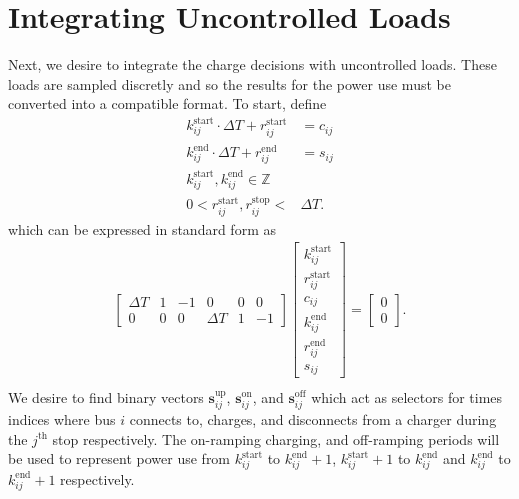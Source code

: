 \section{Integrating Uncontrolled Loads}
Next, we desire to integrate the charge decisions with uncontrolled loads.  These loads are sampled discretly and so the results for the power use must be converted into a compatible format.  To start, define
\begin{equation}
	\begin{aligned}
		k^{\text{start}}_{ij}\cdot\Delta T + r^{\text{start}}_{ij}&= c_{ij} \\
		k^{\text{end}}_{ij}\cdot\Delta T + r^{\text{end}}_{ij}&= s_{ij} \\
	k^{\text{start}}_{ij}, k^{\text{end}}_{ij} \in \mathbb{Z} \\
	0 < r^{\text{start}}_{ij}, r^{\text{stop}}_{ij} < &\Delta T.
	\end{aligned}
\end{equation} 
which can be expressed in standard form as 
\begin{equation} \begin{aligned}
	\begin{bmatrix}\Delta T & 1 & -1 & 0 & 0 & 0\\ 0 & 0 & 0 & \Delta T & 1 & -1\end{bmatrix} \begin{bmatrix}k_{ij}^{\text{start}} \\ r_{ij}^{\text{start}} \\ c_{ij} \\ k_{ij}^{\text{end}} \\ r_{ij}^{\text{end}} \\ s_{ij}\end{bmatrix} = \begin{bmatrix}0 \\ 0 \end{bmatrix}. \\
\end{aligned} \end{equation}
We desire to find binary vectors $\mathbf{s}^{\text{up}}_{ij}$, $\mathbf{s}^{\text{on}}_{ij}$, and $\mathbf{s}^{\text{off}}_{ij}$ which act as selectors for times indices where bus $i$ connects to, charges, and disconnects from a charger during the $j^{\text{th}}$ stop respectively. The on-ramping charging, and off-ramping periods will be used to represent power use from $k^{\text{start}}_{ij}$ to $k^{\text{end}}_{ij} + 1$, $k^{\text{start}}_{ij} + 1$ to $k^{\text{end}}_{ij}$ and $k^{\text{end}}_{ij}$ to $k^{\text{end}}_{ij} + 1$ respectively. 

